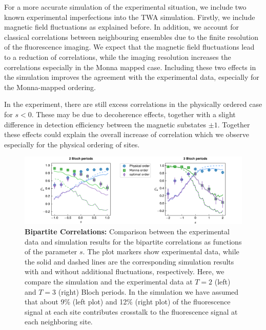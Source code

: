 \begin{bibunit}
For a more accurate simulation of the experimental situation, we include two known experimental imperfections into the TWA simulation. Firstly, we include magnetic field fluctuations as explained before. In addition, we account for classical correlations between neighbouring ensembles due to the finite resolution of the fluorescence imaging. We expect that the magnetic field fluctuations lead to a reduction of correlations, while the imaging resolution increases the correlations especially in the Monna mapped case. Including these two effects in the simulation improves the agreement with the experimental data, especially for the Monna-mapped ordering.

In the experiment, there are still excess correlations in the physically ordered case for $s<0$. These may be due to decoherence effects, together with a slight difference in detection efficiency between the magnetic substates $\pm1$. Together these effects could explain the overall increase of correlation which we observe especially for the physical ordering of sites.
\begin{figure}
    \centering
    \includegraphics[width=\textwidth]{Figures/Supplement3.pdf}
    \caption{\textbf{Bipartite Correlations:} Comparison between the experimental data and simulation results for the bipartite correlations as functions of the parameter $s$. The plot markers show experimental data, while the solid and dashed lines are the corresponding simulation results with and without additional fluctuations, respectively. Here, we compare the simulation and the experimental data at $T=2$ (left) and $T=3$ (right) Bloch periods. In the simulation we have assumed that about 9\% (left plot) and 12\% (right plot) of the fluorescence signal at each site contributes crosstalk to the fluorescence signal at each neighboring site.}
    \label{Fig:Supp_Bipartite}
\end{figure}

\normalem
\putbib[programmable]
\end{bibunit}

